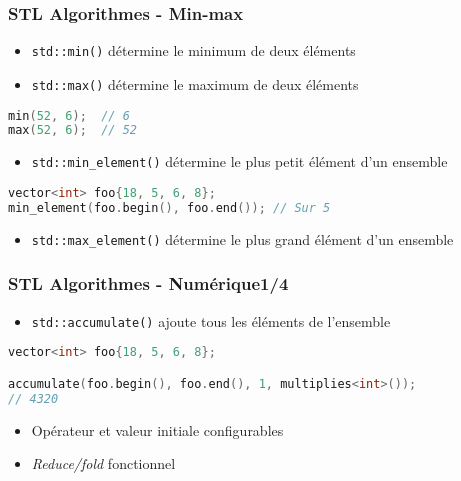 \documentclass[C++.tex]{subfiles}
\begin{document}
\begin{frame}[fragile]
	\frametitle{STL Algorithmes - Min-max}


	\begin{itemize}
		\item \lstinline|std::min()| détermine le minimum de deux éléments
		\item \lstinline|std::max()| détermine le maximum de deux éléments
	\end{itemize}

	\begin{lstlisting}[language=C++]
min(52, 6);  // 6
max(52, 6);  // 52\end{lstlisting}

	\begin{itemize}
		\item \lstinline|std::min_element()| détermine le plus petit élément d'un ensemble
	\end{itemize}

	\begin{lstlisting}[language=C++]
vector<int> foo{18, 5, 6, 8};
min_element(foo.begin(), foo.end()); // Sur 5 \end{lstlisting}

	\begin{itemize}
		\item \lstinline|std::max_element()| détermine le plus grand élément d'un ensemble
	\end{itemize}
\end{frame}

\begin{frame}[fragile]
	\frametitle{STL Algorithmes - Numérique\titlehfill{}1/4}
	\begin{itemize}
		\item \lstinline|std::accumulate()| \og ajoute\fg{} tous les éléments de l'ensemble
	\end{itemize}

	\begin{lstlisting}[language=C++]
vector<int> foo{18, 5, 6, 8};

accumulate(foo.begin(), foo.end(), 1, multiplies<int>());
// 4320 \end{lstlisting}

	\begin{itemize}
		\item Opérateur et valeur initiale configurables
		\item \textit{Reduce/fold} fonctionnel
	\end{itemize}
\end{frame}
\end{document}
